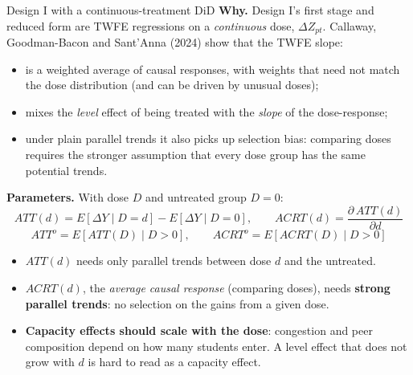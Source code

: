\documentclass{beamer}
\begin{document}
\begin{frame}{Design I with a continuous-treatment DiD}
\scriptsize
\textbf{Why.} Design I's first stage and reduced form are TWFE regressions on a \emph{continuous} dose, $\Delta Z_{pt}$.
Callaway, Goodman-Bacon and Sant'Anna (2024) show that the TWFE slope:
\begin{itemize}
    \item is a weighted average of causal responses, with weights that need not match the dose distribution (and can be driven by unusual doses);
    \item mixes the \emph{level} effect of being treated with the \emph{slope} of the dose-response;
    \item under plain parallel trends it also picks up selection bias: comparing doses requires the stronger assumption that every dose group has the same potential trends.
\end{itemize}

\vspace{0.08cm}
\textbf{Parameters.} With dose $D$ and untreated group $D=0$:
\[
ATT(d)=E[\Delta Y\mid D=d]-E[\Delta Y\mid D=0],\qquad ACRT(d)=\frac{\partial\, ATT(d)}{\partial d}
\]
\[
ATT^o=E[ATT(D)\mid D>0],\qquad ACRT^o=E[ACRT(D)\mid D>0]
\]
\begin{itemize}
    \item $ATT(d)$ needs only parallel trends between dose $d$ and the untreated.
    \item $ACRT(d)$, the \emph{average causal response} (comparing doses), needs \textbf{strong parallel trends}: no selection on the gains from a given dose.
    \item \textbf{Capacity effects should scale with the dose}: congestion and peer composition depend on how many students enter.
    A level effect that does not grow with $d$ is hard to read as a capacity effect.
\end{itemize}
\end{frame}
\end{document}
